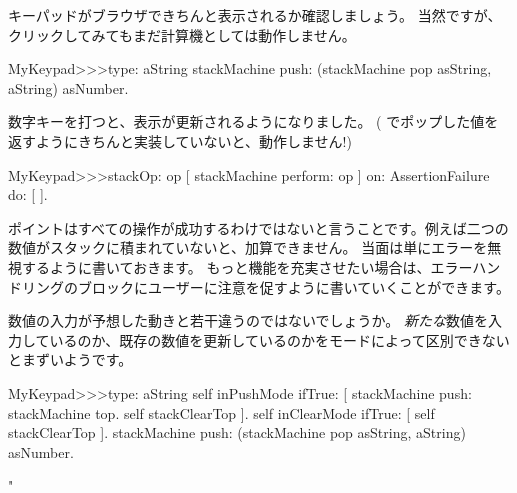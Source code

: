 \documentclass[a4paper,10pt,twoside]{book}
\begin{document}
キーパッドがブラウザできちんと表示されるか確認しましょう。
当然ですが、クリックしてみてもまだ計算機としては動作しません。

\begin{code}{}
MyKeypad>>>type: aString
	stackMachine push: (stackMachine pop asString, aString) asNumber.
\end{code}
数字キーを打つと、表示が更新されるようになりました。
( でポップした値を返すようにきちんと実装していないと、動作しません!)



\begin{code}{}
MyKeypad>>>stackOp: op
	[ stackMachine perform: op ] on: AssertionFailure do: [ ].
\end{code}

ポイントはすべての操作が成功するわけではないと言うことです。例えば二つの数値がスタックに積まれていないと、加算できません。
当面は単にエラーを無視するように書いておきます。
もっと機能を充実させたい場合は、エラーハンドリングのブロックにユーザーに注意を促すように書いていくことができます。


数値の入力が予想した動きと若干違うのではないでしょうか。
\emph{新たな}数値を入力しているのか、既存の数値を更新しているのかをモードによって区別できないとまずいようです。



\begin{code}{}
MyKeypad>>>type: aString
	self inPushMode ifTrue: [
		stackMachine push: stackMachine top.
		self stackClearTop ].
	self inClearMode ifTrue: [ self stackClearTop ].
	stackMachine push: (stackMachine pop asString, aString) asNumber.
\end{code}
"
\end{document}
